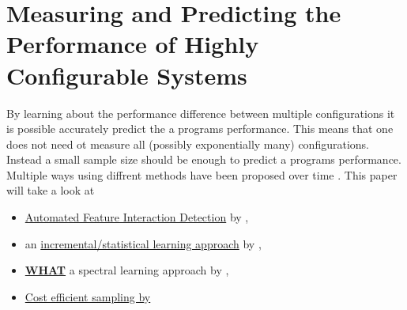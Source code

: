 \section{Measuring and Predicting the Performance of Highly Configurable Systems}\label{sec:measuring}

By learning about the performance difference between multiple configurations it is possible accurately predict the a programs performance. This means that one does not need ot measure all (possibly exponentially many) configurations. Instead a small sample size should be enough to predict a programs performance. Multiple ways using diffrent methods have been proposed over time \cite{FasterDiscoveryofFasterSystemConfigurationsSiegmund2017}. This paper will take a look at
\begin{itemize}
	\item \hyperref[sec:AFID]{Automated Feature Interaction Detection} by \citet{AutomatedFeatureDetectionSiegmund2012},
	\item an \hyperref[sec:IncrementalApproach]{incremental/statistical learning approach} by \citet{VariabilityAwarePerformancePredictionJianmeiSigmundApel},
	\item \hyperref[sec:WHAT]{\textbf{WHAT}} a spectral learning approach by \citet{FasterDiscoveryofFasterSystemConfigurationsSiegmund2017},
	\item \hyperref[sec:ProjectiveSampling]{Cost efficient sampling by \cite{CostEfficientSampling_Gou_Siegmund_2015}}
\end{itemize}



%







